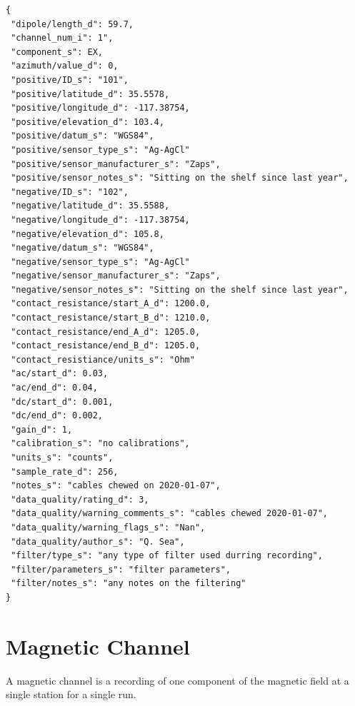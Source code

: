 \documentclass{article}
\begin{document}
\begin{verbatim}
{
 "dipole/length_d": 59.7,
 "channel_num_i": 1",
 "component_s": EX,
 "azimuth/value_d": 0,
 "positive/ID_s": "101",
 "positive/latitude_d": 35.5578,
 "positive/longitude_d": -117.38754,
 "positive/elevation_d": 103.4,
 "positive/datum_s": "WGS84",
 "positive/sensor_type_s": "Ag-AgCl"
 "positive/sensor_manufacturer_s": "Zaps",
 "positive/sensor_notes_s": "Sitting on the shelf since last year",
 "negative/ID_s": "102",
 "negative/latitude_d": 35.5588,
 "negative/longitude_d": -117.38754,
 "negative/elevation_d": 105.8,
 "negative/datum_s": "WGS84",
 "negative/sensor_type_s": "Ag-AgCl"
 "negative/sensor_manufacturer_s": "Zaps",
 "negative/sensor_notes_s": "Sitting on the shelf since last year",
 "contact_resistance/start_A_d": 1200.0,
 "contact_resistance/start_B_d": 1210.0,
 "contact_resistance/end_A_d": 1205.0,
 "contact_resistance/end_B_d": 1205.0,
 "contact_resistiance/units_s": "Ohm"
 "ac/start_d": 0.03,
 "ac/end_d": 0.04,
 "dc/start_d": 0.001,
 "dc/end_d": 0.002,
 "gain_d": 1,
 "calibration_s": "no calibrations",
 "units_s": "counts",
 "sample_rate_d": 256,
 "notes_s": "cables chewed on 2020-01-07",
 "data_quality/rating_d": 3,
 "data_quality/warning_comments_s": "cables chewed 2020-01-07",
 "data_quality/warning_flags_s": "Nan",
 "data_quality/author_s": "Q. Sea",
 "filter/type_s": "any type of filter used durring recording",
 "filter/parameters_s": "filter parameters",
 "filter/notes_s": "any notes on the filtering"
}
\end{verbatim}

\newpage
\section{Magnetic Channel}

A magnetic channel is a recording of one component of the magnetic field at a single station for a single run.
\end{document}
